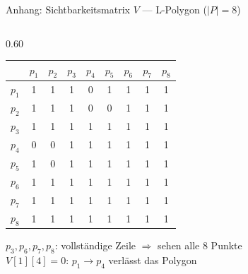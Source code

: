 \documentclass[11pt,aspectratio=169]{beamer}
\begin{document}
\begin{frame}{Anhang: Sichtbarkeitsmatrix $V$ — L-Polygon ($|P|=8$)}
\begin{columns}[T]
\begin{column}{0.60\textwidth}
      \setlength{\tabcolsep}{3.5pt}
      \begin{tabular}{c|cccccccc}
        \toprule
         & $p_1$ & $p_2$ & $p_3$ & $p_4$ & $p_5$ & $p_6$ & $p_7$ & $p_8$ \\
        \midrule
        $p_1$ & \cellcolor{lightgreen!70}1 & \cellcolor{lightgreen!70}1 & \cellcolor{lightgreen!70}1 & 0 & \cellcolor{lightgreen!70}1 & \cellcolor{lightgreen!70}1 & \cellcolor{lightgreen!70}1 & \cellcolor{lightgreen!70}1 \\
        $p_2$ & \cellcolor{lightgreen!70}1 & \cellcolor{lightgreen!70}1 & \cellcolor{lightgreen!70}1 & 0 & 0 & \cellcolor{lightgreen!70}1 & \cellcolor{lightgreen!70}1 & \cellcolor{lightgreen!70}1 \\
        $p_3$ & \cellcolor{lightgreen!70}1 & \cellcolor{lightgreen!70}1 & \cellcolor{lightgreen!70}1 & \cellcolor{lightgreen!70}1 & \cellcolor{lightgreen!70}1 & \cellcolor{lightgreen!70}1 & \cellcolor{lightgreen!70}1 & \cellcolor{lightgreen!70}1 \\
        $p_4$ & 0 & 0 & \cellcolor{lightgreen!70}1 & \cellcolor{lightgreen!70}1 & \cellcolor{lightgreen!70}1 & \cellcolor{lightgreen!70}1 & \cellcolor{lightgreen!70}1 & \cellcolor{lightgreen!70}1 \\
        $p_5$ & \cellcolor{lightgreen!70}1 & 0 & \cellcolor{lightgreen!70}1 & \cellcolor{lightgreen!70}1 & \cellcolor{lightgreen!70}1 & \cellcolor{lightgreen!70}1 & \cellcolor{lightgreen!70}1 & \cellcolor{lightgreen!70}1 \\
        $p_6$ & \cellcolor{lightgreen!70}1 & \cellcolor{lightgreen!70}1 & \cellcolor{lightgreen!70}1 & \cellcolor{lightgreen!70}1 & \cellcolor{lightgreen!70}1 & \cellcolor{lightgreen!70}1 & \cellcolor{lightgreen!70}1 & \cellcolor{lightgreen!70}1 \\
        $p_7$ & \cellcolor{lightgreen!70}1 & \cellcolor{lightgreen!70}1 & \cellcolor{lightgreen!70}1 & \cellcolor{lightgreen!70}1 & \cellcolor{lightgreen!70}1 & \cellcolor{lightgreen!70}1 & \cellcolor{lightgreen!70}1 & \cellcolor{lightgreen!70}1 \\
        $p_8$ & \cellcolor{lightgreen!70}1 & \cellcolor{lightgreen!70}1 & \cellcolor{lightgreen!70}1 & \cellcolor{lightgreen!70}1 & \cellcolor{lightgreen!70}1 & \cellcolor{lightgreen!70}1 & \cellcolor{lightgreen!70}1 & \cellcolor{lightgreen!70}1 \\
        \bottomrule
      \end{tabular}
      \vspace{0.5em}

      \small
      $p_3, p_6, p_7, p_8$: vollständige Zeile $\Rightarrow$ sehen alle 8 Punkte\\[0.2em]
      $V[1][4]=0$: $p_1{\to}p_4$ verlässt das Polygon
    \end{column}
  \end{columns}
\end{frame}
\end{document}

